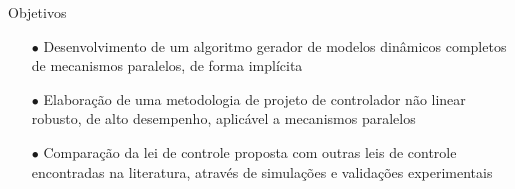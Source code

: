 \documentclass[25pt,landscape]{beamer}
\begin{document}

\begin{frame}{Objetivos}
	\begin{block}{}
		\pause
		\begin{itemize}
			\item[$\bullet$] Desenvolvimento de um algoritmo gerador de modelos din\^amicos completos de mecanismos paralelos, de forma impl\'icita \\[8pt]
			\pause
			\item[$\bullet$] Elabora\c{c}\~ao de uma metodologia de projeto de controlador n\~ao linear robusto, de alto desempenho, aplic\'avel a mecanismos paralelos \\[8pt]
			\pause
			\item[$\bullet$] Compara\c{c}\~ao da lei de controle proposta com outras leis de controle encontradas na literatura, atrav\'es de simula\c{c}\~oes e valida\c{c}\~oes experimentais \\[8pt]
	\end{itemize}
	\end{block}
\end{frame}
\end{document}
